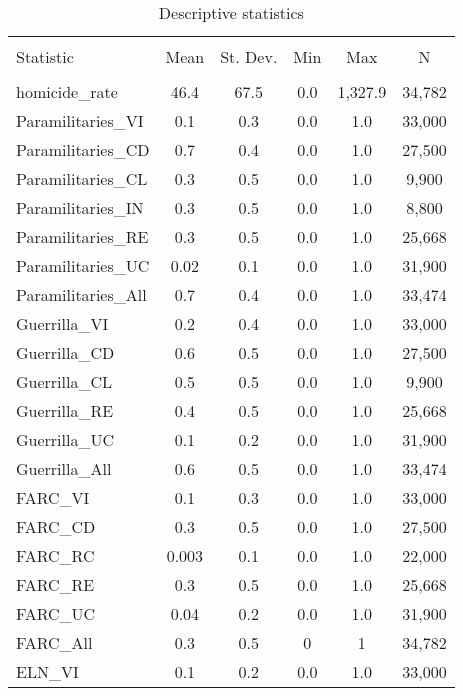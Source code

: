 
\begin{table}[!htbp] \centering 
  \caption{Descriptive statistics} 
  \label{} 
\begin{tabular}{@{\extracolsep{5pt}}lccccc} 
\\[-1.8ex]\hline 
\hline \\[-1.8ex] 
Statistic & \multicolumn{1}{c}{Mean} & \multicolumn{1}{c}{St. Dev.} & \multicolumn{1}{c}{Min} & \multicolumn{1}{c}{Max} & \multicolumn{1}{c}{N} \\ 
\hline \\[-1.8ex] 
homicide\_rate & 46.4 & 67.5 & 0.0 & 1,327.9 & 34,782 \\ 
Paramilitaries\_VI & 0.1 & 0.3 & 0.0 & 1.0 & 33,000 \\ 
Paramilitaries\_CD & 0.7 & 0.4 & 0.0 & 1.0 & 27,500 \\ 
Paramilitaries\_CL & 0.3 & 0.5 & 0.0 & 1.0 & 9,900 \\ 
Paramilitaries\_IN & 0.3 & 0.5 & 0.0 & 1.0 & 8,800 \\ 
Paramilitaries\_RE & 0.3 & 0.5 & 0.0 & 1.0 & 25,668 \\ 
Paramilitaries\_UC & 0.02 & 0.1 & 0.0 & 1.0 & 31,900 \\ 
Paramilitaries\_All & 0.7 & 0.4 & 0.0 & 1.0 & 33,474 \\ 
Guerrilla\_VI & 0.2 & 0.4 & 0.0 & 1.0 & 33,000 \\ 
Guerrilla\_CD & 0.6 & 0.5 & 0.0 & 1.0 & 27,500 \\ 
Guerrilla\_CL & 0.5 & 0.5 & 0.0 & 1.0 & 9,900 \\ 
Guerrilla\_RE & 0.4 & 0.5 & 0.0 & 1.0 & 25,668 \\ 
Guerrilla\_UC & 0.1 & 0.2 & 0.0 & 1.0 & 31,900 \\ 
Guerrilla\_All & 0.6 & 0.5 & 0.0 & 1.0 & 33,474 \\ 
FARC\_VI & 0.1 & 0.3 & 0.0 & 1.0 & 33,000 \\ 
FARC\_CD & 0.3 & 0.5 & 0.0 & 1.0 & 27,500 \\ 
FARC\_RC & 0.003 & 0.1 & 0.0 & 1.0 & 22,000 \\ 
FARC\_RE & 0.3 & 0.5 & 0.0 & 1.0 & 25,668 \\ 
FARC\_UC & 0.04 & 0.2 & 0.0 & 1.0 & 31,900 \\ 
FARC\_All & 0.3 & 0.5 & 0 & 1 & 34,782 \\ 
ELN\_VI & 0.1 & 0.2 & 0.0 & 1.0 & 33,000 \\ 

\end{tabular}
\end{table}
